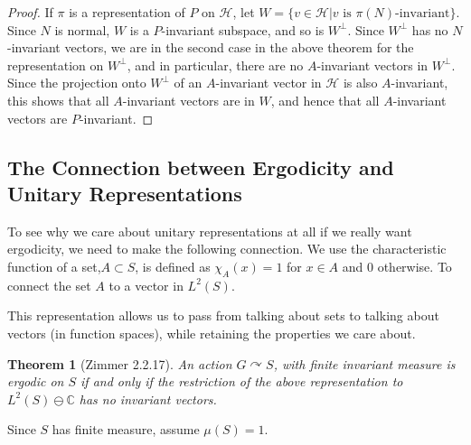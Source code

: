 \documentclass[
  12pt
]{article}
\newtheorem{thm}{Theorem}[section]
\theoremstyle{plain}
\newtheorem*{proof}{Proof}
\newcommand{\mpi}{\ensuremath{\pi}\xspace}
\newcommand{\hilb}{\ensuremath{\mathscr{H}}\xspace}
\begin{document}
  \begin{proof}
    If \mpi is a representation of $P$ on \hilb, let $W=\{v \in \hilb|v \text{ is } \pi(N)\text{-invariant}\}$.
    Since $N$ is normal, $W$ is a $P$-invariant subspace, and so is $W^{\perp}$. 
    Since $W^{\perp}$ has no $N$-invariant vectors, we are in the second case
    in the above theorem for the representation on $W^{\perp}$, and in
    particular, there are no $A$-invariant vectors in $W^{\perp}$. Since the
    projection onto $W^{\perp}$ of an $A$-invariant vector in \hilb is also
    $A$-invariant, this shows that all $A$-invariant vectors are in $W$, and
    hence that all $A$-invariant vectors are $P$-invariant.
  \end{proof}



  \hypertarget{the-connection-between-ergodicity-and-unitary-representations}{%
  \subsection{The Connection between Ergodicity and Unitary Representations}\label{the-connection-between-ergodicity-and-unitary-representations}}

  To see why we care about unitary representations at all if we really
  want ergodicity, we need to make the following connection. We use the
  characteristic function of a set,$A\subset S$, is defined as $\chi_A(x) = 1$
  for $x \in A$ and $0$ otherwise. To connect the set $A$ to a vector in
  $L^2(S)$.

  This representation allows us to pass from talking about sets to talking
  about vectors (in function spaces), while retaining the properties we care
  about.


  \begin{thm}[Zimmer 2.2.17]
    \label{thm:2.2.17}
    An action $G\curvearrowright S$, with \emph{ finite } invariant measure is
    ergodic on $S$ if and only if the restriction of the above representation
    to $L^2(S) \ominus \mathbb{C}$ has no invariant vectors.
  \end{thm}
    
  Since $S$ has finite measure, assume $\mu(S) =1$.
\end{document}

